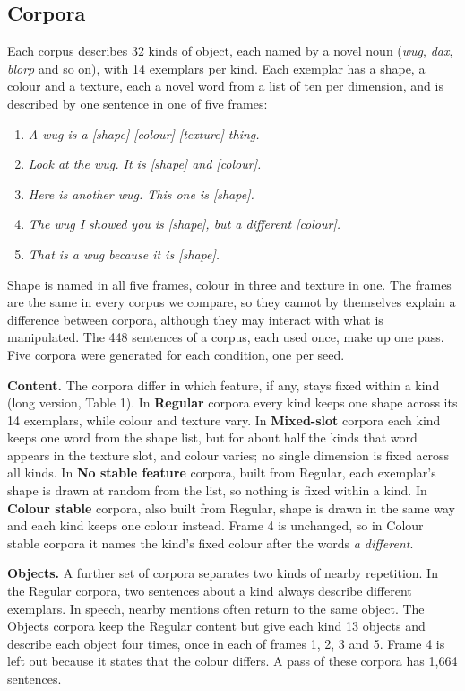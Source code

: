 \subsection{Corpora}
Each corpus describes 32 kinds of object, each named by a novel noun (\emph{wug}, \emph{dax}, \emph{blorp} and so on), with 14 exemplars per kind. Each exemplar has a shape, a colour and a texture, each a novel word from a list of ten per dimension, and is described by one sentence in one of five frames:

\begin{enumerate}
\item \emph{A wug is a [shape] [colour] [texture] thing.}
\item \emph{Look at the wug. It is [shape] and [colour].}
\item \emph{Here is another wug. This one is [shape].}
\item \emph{The wug I showed you is [shape], but a different [colour].}
\item \emph{That is a wug because it is [shape].}
\end{enumerate}

Shape is named in all five frames, colour in three and texture in one. The frames are the same in every corpus we compare, so they cannot by themselves explain a difference between corpora, although they may interact with what is manipulated. The 448 sentences of a corpus, each used once, make up one pass. Five corpora were generated for each condition, one per seed.

\textbf{Content.} The corpora differ in which feature, if any, stays fixed within a kind (long version, Table 1). In \textbf{Regular} corpora every kind keeps one shape across its 14 exemplars, while colour and texture vary. In \textbf{Mixed-slot} corpora each kind keeps one word from the shape list, but for about half the kinds that word appears in the texture slot, and colour varies; no single dimension is fixed across all kinds. In \textbf{No stable feature} corpora, built from Regular, each exemplar's shape is drawn at random from the list, so nothing is fixed within a kind. In \textbf{Colour stable} corpora, also built from Regular, shape is drawn in the same way and each kind keeps one colour instead. Frame 4 is unchanged, so in Colour stable corpora it names the kind's fixed colour after the words \emph{a different}.

\textbf{Objects.} A further set of corpora separates two kinds of nearby repetition. In the Regular corpora, two sentences about a kind always describe different exemplars. In speech, nearby mentions often return to the same object. The Objects corpora keep the Regular content but give each kind 13 objects and describe each object four times, once in each of frames 1, 2, 3 and 5. Frame 4 is left out because it states that the colour differs. A pass of these corpora has 1,664 sentences.

